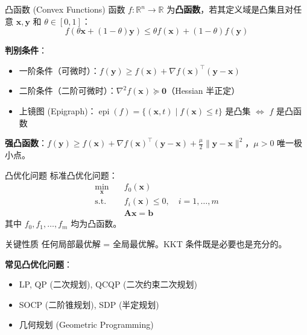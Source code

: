 \documentclass[11pt, aspectratio=169, svgnames, table, fontset=fandol]{ctexbeamer}
\newcommand{\R}{\mathbb{R}}
\newcommand{\epi}{\operatorname{epi}}
\begin{document}
\begin{frame}{凸函数 (Convex Functions)}
  函数 $f: \R^n \to \R$ 为\textbf{凸函数}，若其定义域是凸集且对任意 $\bm{x}, \bm{y}$ 和 $\theta \in [0,1]$：
  \begin{equation*}
    f(\theta \bm{x} + (1-\theta)\bm{y}) \leq \theta f(\bm{x}) + (1-\theta) f(\bm{y})
  \end{equation*}

  \vspace{6pt}
  \textbf{判别条件}：
  \begin{itemize}
    \item 一阶条件（可微时）：$f(\bm{y}) \geq f(\bm{x}) + \nabla f(\bm{x})^\top (\bm{y}-\bm{x})$
    \item 二阶条件（二阶可微时）：$\nabla^2 f(\bm{x}) \succcurlyeq \bm{0}$（Hessian 半正定）
    \item 上镜图 (Epigraph)：$\epi(f) = \{(\bm{x}, t) \mid f(\bm{x}) \leq t\}$ 是凸集 $\Longleftrightarrow$ $f$ 是凸函数
  \end{itemize}

  \vspace{4pt}
  \textbf{强凸函数}：$f(\bm{y}) \geq f(\bm{x}) + \nabla f(\bm{x})^\top (\bm{y}-\bm{x}) + \frac{\mu}{2}\|\bm{y}-\bm{x}\|^2$，$\mu > 0$ 唯一极小点。
\end{frame}

\begin{frame}{凸优化问题}
  标准凸优化问题：
  \begin{align*}
    \min_{\bm{x}} \quad & f_0(\bm{x}) \\
    \text{s.t.} \quad   & f_i(\bm{x}) \leq 0,\quad i=1,\dots,m \\
                        & \bm{Ax} = \bm{b}
  \end{align*}
  其中 $f_0, f_1, \dots, f_m$ 均为凸函数。

  \vspace{6pt}
  \begin{block}{关键性质}
    任何局部最优解 = 全局最优解。KKT 条件既是必要也是充分的。
  \end{block}

  \vspace{4pt}
  \textbf{常见凸优化问题}：
  \begin{itemize}
    \item LP, QP (二次规划), QCQP (二次约束二次规划)
    \item SOCP (二阶锥规划), SDP (半定规划)
    \item 几何规划 (Geometric Programming)
  \end{itemize}
\end{frame}
\end{document}
